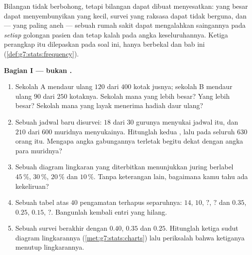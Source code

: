\begin{problem}
\label{pb:g7:stats:1}
Bilangan tidak berbohong, tetapi bilangan dapat dibuat menyesatkan:
 yang besar dapat menyembunyikan  yang
kecil, survei yang raksasa dapat tidak berguna, dan --- yang paling
aneh --- sebuah rumah sakit dapat mengalahkan saingannya pada
\emph{setiap} golongan pasien dan tetap kalah pada angka
keseluruhannya. Ketiga perangkap itu dilepaskan pada soal ini, hanya
berbekal  dan  bab ini
(\cref{def:g7:stats:frequency}).

\medskip
\noindent\textbf{Bagian I ---  bukan .}
\begin{enumerate}
  \item Sekolah A mendaur ulang $120$ dari $400$ kotak jusnya; sekolah
        B mendaur ulang $90$ dari $250$ kotaknya. Sekolah mana yang
        \emph{} lebih besar? Yang \emph{} lebih besar? Sekolah mana yang layak menerima
        hadiah daur ulang?
  \item Sebuah jadwal baru disurvei: $18$ dari $30$ gurunya menyukai
        jadwal itu, dan $210$ dari $600$ muridnya menyukainya.
        Hitunglah kedua , lalu 
        pada seluruh $630$ orang itu. Mengapa angka gabungannya
        terletak begitu dekat dengan angka para muridnya?
  \item Sebuah diagram lingkaran yang diterbitkan menunjukkan juring
        berlabel $45\,\%$, $30\,\%$, $20\,\%$ dan $10\,\%$. Tanpa
        keterangan lain, bagaimana kamu tahu ada kekeliruan?
  \item Sebuah tabel  atas $40$ pengamatan terhapus
        separuhnya:  $14$, $10$, $?$, $?$ dan  $0.35$, $0.25$, $0.15$, $?$. Bangunlah kembali
        entri yang hilang.
  \item Sebuah survei berakhir dengan  $0.40$, $0.35$
        dan $0.25$. Hitunglah ketiga sudut diagram lingkarannya
        (\cref{met:g7:stats:charts}) lalu periksalah bahwa ketiganya
        menutup lingkarannya.
\end{enumerate}


\end{problem}
